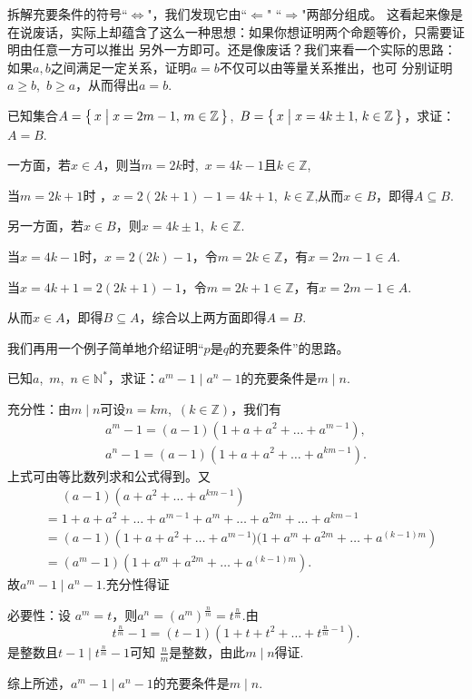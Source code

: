 拆解充要条件的符号``$\Leftrightarrow $"，我们发现它由``$\Leftarrow$" ``$\Rightarrow $"两部分组成。
这看起来像是在说废话，实际上却蕴含了这么一种思想：如果你想证明两个命题等价，只需要证明由任意一方可以推出
另外一方即可。还是像废话？我们来看一个实际的思路：如果$a,b$之间满足一定关系，证明$a=b$不仅可以由等量关系推出，也可
分别证明$a\geqslant b$,~$b\geqslant a$，从而得出$a=b$.
\begin{example}
    已知集合$A=\bigl\{\,x \bigm| x=2m-1,\,m\in \mathbb{Z} \,\bigr\}$,~$B=\bigl\{\,x \bigm| x=4k\pm 1,\,k\in \mathbb{Z} \,\bigr\} $，求证：$A=B$.
\end{example}
\begin{prove}
    一方面，若$x\in A$，则当$m=2k$时,~$x=4k-1$且$k\in \mathbb{Z}$,


    当$m=2k+1$时
    ，$x=2(2k+1)-1=4k+1$,~$k\in \mathbb{Z}$,从而$x\in B$，即得$A\subseteq B$.


    另一方面，若$x∈B$，则$x=4k±1$,~$k\in \mathbb{Z}$.


    当$x=4k-1$时，$x=2(2k)-1$，令$m=2k\in \mathbb{Z}$，有$x=2m-1\in A$.


    当$x=4k+1=2(2k+1)-1$，令$m=2k+1\in \mathbb{Z}$，有$x=2m-1\in A$.


    从而$x\in A$，即得$B\subseteq A$，综合以上两方面即得$A=B$.
\end{prove}


我们再用一个例子简单地介绍证明“$p$是$q$的充要条件”的思路。
\begin{example}
    已知$a$,~$m$,~$n\in \mathbb{N^*}$，求证：$a^m-1\mid a^n-1$的充要条件是$m\mid n$.
\end{example}
\begin{prove}
    充分性：由$m\mid n$可设$n=km$,~$(k\in \mathbb{Z})$，我们有
    \[
        \begin{aligned}
            a^m-1=(a-1)(1+a+a^2+\dots +a^{m-1}), \\
            a^n-1=(a-1)(1+a+a^2+\dots +a^{km-1}).
        \end{aligned}
    \]
    上式可由等比数列求和公式得到。又
    \[
        \begin{aligned}
             & \mathrel{\phantom{=}} (a-1)\left( a+a^2+\dots +a^{km-1} \right)               \\
             & =  1+a+a^2+\dots +a^{m-1}+a^m+\dots+a^{2m}+\dots+a^{km-1}                     \\
             & =  (a-1)\left( 1+a+a^2+\dots +a^{m-1})(1+a^m+a^{2m}+\dots +a^{(k-1)m} \right) \\
             & =  (a^m-1)\left( 1+a^m+a^{2m}+\dots +a^{(k-1)m} \right) .
        \end{aligned}
    \]
    故$a^m-1\mid a^n-1$.充分性得证


    必要性：设 $a^m=t$，则$a^n=(a^m)^{\frac{n}{m}}=t^{\frac{n}{m}}$.由
    \[
        t^{\frac{n}{m}}-1=(t-1)\left( 1+t+t^2+\dots +t^{\frac{n}{m}-1} \right)
        .\]
    是整数且$t-1\mid t^{\frac{n}{m}}-1$可知
    $\frac{n}{m}$是整数，由此$m\mid n$得证.


    综上所述，$a^m-1\mid a^n-1$的充要条件是$m\mid n$.

\end{prove}

